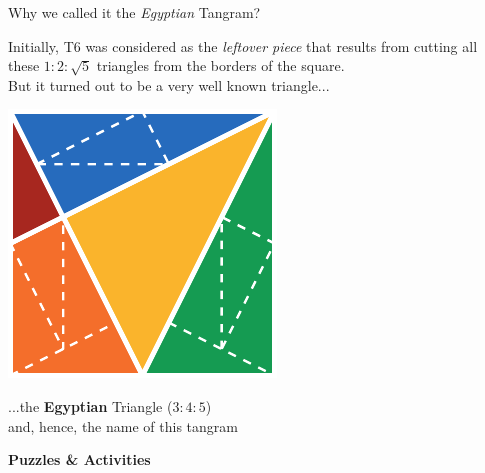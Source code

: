 \documentclass[14pt]{beamer}
\begin{document}
    \begin{frame}{Why we called it the \emph{Egyptian} Tangram?}
        \begin{center}
            {\small Initially, T6 was considered as the \emph{leftover piece} that results from cutting all these $1\!\!:\!\!2\!\!:\!\!\sqrt{5}$ triangles from the borders of the square.\\But it turned out to be a very well known triangle...}

            \bigskip \bigskip

            \includegraphics[height=15ex]{figures/figure003a.pdf} \\

            \bigskip \bigskip

            ...the \textbf{Egyptian} Triangle ($3\!\!:\!\!4\!\!:\!\!5$)\\{\small and, hence, the name of this tangram}
        \end{center}
    \end{frame}


    \begin{frame}{}
        \begin{center}
            \textbf{\Huge Puzzles \& Activities}\\
        \end{center}
    \end{frame}

\end{document}
